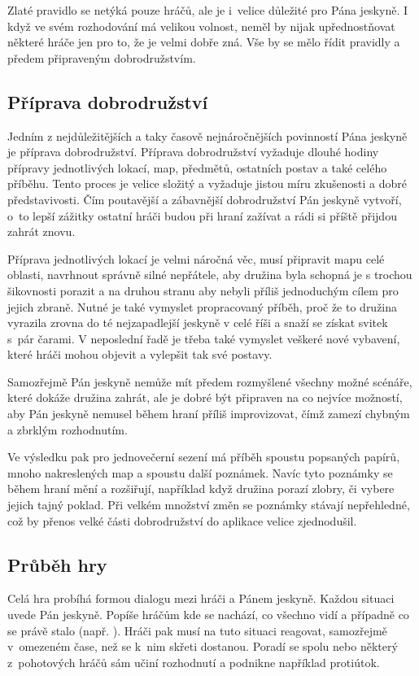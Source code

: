 \documentclass[thesis=B,czech]{resources/FITthesis}[2012/06/26]
\begin{document}
Zlaté pravidlo se netýká pouze hráčů, ale je i~velice důležité pro Pána jeskyně. I když ve svém rozhodování má velikou volnost, neměl by nijak upřednostňovat některé hráče jen pro to, že je velmi dobře zná. Vše by se mělo řídit pravidly a předem připraveným dobrodružstvím. 


	\subsection{Příprava dobrodružství}
Jedním z nejdůležitějších a taky časově nejnáročnějších povinností Pána jeskyně je příprava dobrodružství. Příprava dobrodružství vyžaduje dlouhé hodiny přípravy jednotlivých lokací, map, předmětů, ostatních postav a také celého příběhu. Tento proces je velice složitý a vyžaduje jistou míru zkušenosti a dobré představivosti. Čím poutavější a zábavnější dobrodružství Pán jeskyně vytvoří, o~to lepší zážitky ostatní hráči budou při hraní zažívat a rádi si příště přijdou zahrát znovu. \par

Příprava jednotlivých lokací je velmi náročná věc, musí připravit mapu celé oblasti, navrhnout správně silné nepřátele, aby družina byla schopná je s trochou šikovnosti porazit a na druhou stranu aby nebyli příliš jednoduchým cílem pro jejich zbraně. Nutné je také vymyslet propracovaný příběh, proč že to družina vyrazila zrovna do té nejzapadlejší jeskyně v celé říši a snaží se získat svitek s~pár čarami. V neposlední řadě je třeba také vymyslet veškeré nové vybavení, které hráči mohou objevit a vylepšit tak své postavy. \par

Samozřejmě Pán jeskyně nemůže mít předem rozmyšlené všechny možné scénáře, které dokáže družina zahrát, ale je dobré být připraven na co nejvíce možností, aby Pán jeskyně nemusel během hraní příliš improvizovat, čímž zamezí chybným a zbrklým rozhodnutím. \par

Ve výsledku pak pro jednovečerní sezení má příběh spoustu popsaných papírů, mnoho nakreslených map a spoustu další poznámek. Navíc tyto poznámky se během hraní mění a rozšiřují, například když družina porazí zlobry, či vybere jejich tajný poklad. Při velkém množství změn se poznámky stávají nepřehledné, což by přenos velké části dobrodružství do aplikace velice zjednodušil. 
	
	\subsection{Průběh hry}
Celá hra probíhá formou dialogu mezi hráči a Pánem jeskyně. Každou situaci uvede Pán jeskyně. Popíše hráčům kde se nachází, co všechno vidí a případně co se právě stalo (např. ). Hráči pak musí na tuto situaci reagovat, samozřejmě v~omezeném čase, než se k~nim skřeti dostanou. Poradí se spolu nebo některý z~pohotových hráčů sám učiní rozhodnutí a podnikne například protiútok. \par
\end{document}
